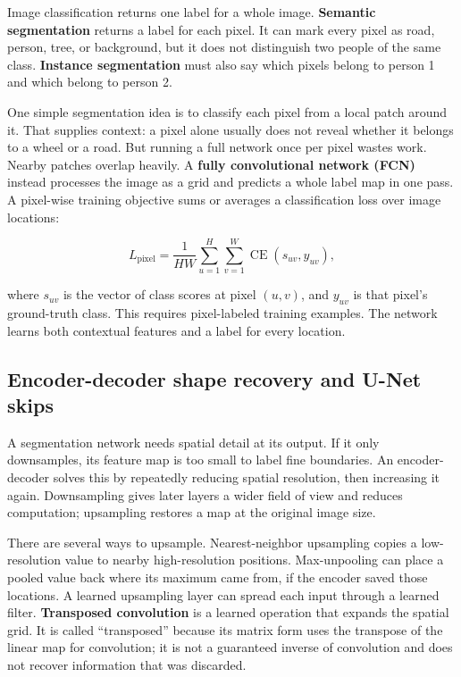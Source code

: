 Image classification returns one label for a whole image. \textbf{Semantic segmentation} returns a label for each pixel. It can mark every pixel as road, person, tree, or background, but it does not distinguish two people of the same class. \textbf{Instance segmentation} must also say which pixels belong to person 1 and which belong to person 2.

One simple segmentation idea is to classify each pixel from a local patch around it. That supplies context: a pixel alone usually does not reveal whether it belongs to a wheel or a road. But running a full network once per pixel wastes work. Nearby patches overlap heavily. A \textbf{fully convolutional network (FCN)} instead processes the image as a grid and predicts a whole label map in one pass. A pixel-wise training objective sums or averages a classification loss over image locations:

\[
L_{\text{pixel}}=\frac{1}{HW}\sum_{u=1}^{H}\sum_{v=1}^{W}\operatorname{CE}(s_{uv},y_{uv}),
\]

where \(s_{uv}\) is the vector of class scores at pixel \((u,v)\), and \(y_{uv}\) is that pixel's ground-truth class. This requires pixel-labeled training examples. The network learns both contextual features and a label for every location.

\subsection{Encoder-decoder shape recovery and U-Net skips}\label{04-visual-computing-ii-ch031-encoder-decoder-shape-recovery-and-u-net-skips}

\hypertarget{04-visual-computing-ii-ch031-encoder-decoder-shape-recovery-and-u-net-skips}{}

A segmentation network needs spatial detail at its output. If it only downsamples, its feature map is too small to label fine boundaries. An encoder-decoder solves this by repeatedly reducing spatial resolution, then increasing it again. Downsampling gives later layers a wider field of view and reduces computation; upsampling restores a map at the original image size.

There are several ways to upsample. Nearest-neighbor upsampling copies a low-resolution value to nearby high-resolution positions. Max-unpooling can place a pooled value back where its maximum came from, if the encoder saved those locations. A learned upsampling layer can spread each input through a learned filter. \textbf{Transposed convolution} is a learned operation that expands the spatial grid. It is called ``transposed'' because its matrix form uses the transpose of the linear map for convolution; it is not a guaranteed inverse of convolution and does not recover information that was discarded.

